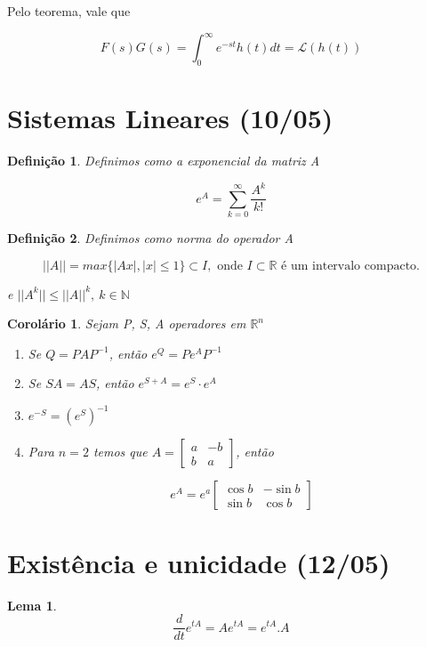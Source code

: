 \documentclass{article}
\newtheorem{corollary}{Corolário}[theorem]
\newtheorem{lemma}[theorem]{Lema}
\newtheorem{definition}{Definição}
\begin{document}
Pelo teorema, vale que

$$F(s) G(s) = \int_0^\infty e^{- st} h(t) d t = \mathscr{L}(h(t))$$

\section*{Sistemas Lineares (10/05)}
\label{s15}
\begin{definition}
    Definimos como a exponencial da matriz A
    
    $$e^A = \sum_{k = 0}^\infty \frac{A^k}{k!}$$
\end{definition}

\begin{definition}
    Definimos como norma do operador A
    
    $$||A|| = max \{ |Ax|, |x| \leq 1 \} \subset I, \text{ onde } I \subset \mathbb{R} \text{ é um intervalo compacto.}$$
    
    e $||A^k|| \leq ||A||^k, \ k \in \mathbb{N}$ 
\end{definition}

\begin{corollary}
    Sejam P, S, A operadores em $\mathbb{R}^n$
    
    \begin{enumerate}
        \item Se $Q = P A P^{-1}$, então $e^Q = P e^A P^{-1}$
        
        \item Se $S A = A S$, então $e^{S + A} = e^S \cdot    e^A$
        
        \item $e^{-S} = (e^S)^{-1}$
        
        \item Para $n = 2$ temos que $ A = \left [ \begin{array}{cc}
             a & -b \\
             b & a
        \end{array} \right ]$, então
        
        $$e^A = e^a \left [ \begin{array}{cc}
             \cos{b} & -\sin{b} \\
             \sin{b} & \cos{b}
        \end{array} \right ]$$
    \end{enumerate}
\end{corollary}

\section*{Existência e unicidade (12/05)}
\label{s16}
\begin{lemma}
    $$\dfrac{d}{d t} e^{t A} = A e^{t A} = e^{t A} . A$$
\end{lemma}
\end{document}
